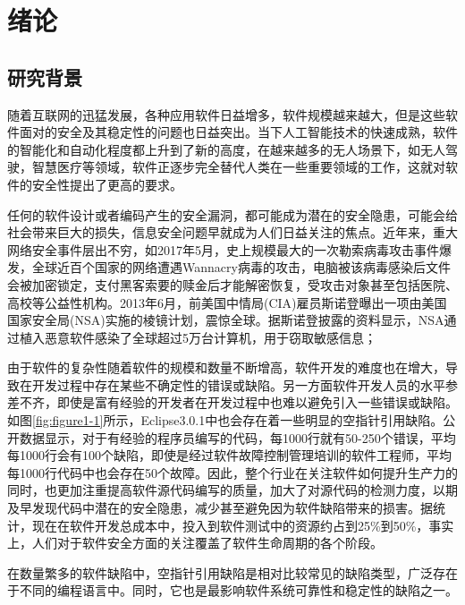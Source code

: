 \chapter{绪论}
\label{chap:intro}
\section{研究背景}

随着互联网的迅猛发展，各种应用软件日益增多，软件规模越来越大，但是这些软件面对的安全及其稳定性的问题也日益突出。当下人工智能技术的快速成熟，软件的智能化和自动化程度都上升到了新的高度，在越来越多的无人场景下，如无人驾驶，智慧医疗等领域，软件正逐步完全替代人类在一些重要领域的工作，这就对软件的安全性\cite{chess2011software}提出了更高的要求。

任何的软件设计或者编码产生的安全漏洞\cite{shan2002}，都可能成为潜在的安全隐患，可能会给社会带来巨大的损失，信息安全问题早就成为人们日益关注的焦点\cite{vassilev2014importance}。近年来，重大网络安全事件层出不穷，如2017年5月，史上规模最大的一次勒索病毒攻击事件爆发，全球近百个国家的网络遭遇Wannacry病毒\cite{li2017wannacry}的攻击，电脑被该病毒感染后文件会被加密锁定，支付黑客索要的赎金后才能解密恢复，受攻击对象甚至包括医院、高校等公益性机构。2013年6月，前美国中情局(CIA)雇员斯诺登曝出一项由美国国家安全局(NSA)实施的棱镜计划\cite{zhang2014}，震惊全球。据斯诺登披露的资料显示，NSA通过植入恶意软件感染了全球超过5万台计算机，用于窃取敏感信息；

由于软件的复杂性随着软件的规模和数量不断增高，软件开发的难度也在增大，导致在开发过程中存在某些不确定性的错误或缺陷。另一方面软件开发人员的水平参差不齐，即使是富有经验的开发者在开发过程中也难以避免引入一些错误或缺陷。如图\ref{fig:figure1-1}所示，Eclipse3.0.1中也会存在着一些明显的空指针引用缺陷\cite{hovemeyer2005evaluating}。公开数据显示，对于有经验的程序员编写的代码，每1000行就有50-250个错误，平均每1000行会有100个缺陷，即使是经过软件故障控制管理培训的软件工程师，平均每1000行代码中也会存在50个故障\cite{gong2008}。因此，整个行业在关注软件如何提升生产力的同时，也更加注重提高软件源代码编写的质量，加大了对源代码的检测力度，以期及早发现代码中潜在的安全隐患，减少甚至避免因为软件缺陷带来的损害。据统计，现在在软件开发总成本中，投入到软件测试中的资源约占到25\%到50\%\cite{gong2006}，事实上，人们对于软件安全方面的关注覆盖了软件生命周期的各个阶段。

在数量繁多的软件缺陷中，空指针引用缺陷是相对比较常见的缺陷类型，广泛存在于不同的编程语言中。同时，它也是最影响软件系统可靠性和稳定性的缺陷之一。

